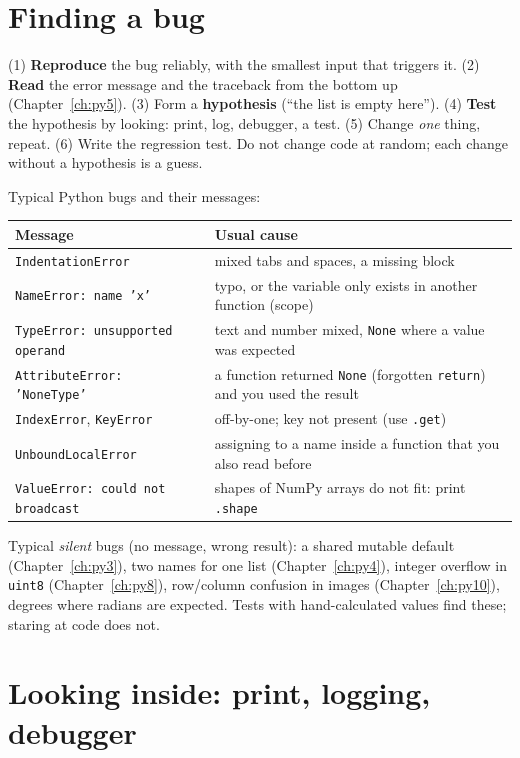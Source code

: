 \section*{Finding a bug}
\begin{keyidea}
(1) \textbf{Reproduce} the bug reliably, with the smallest input that triggers it. (2) \textbf{Read} the error message and the traceback from the bottom up (Chapter~\ref{ch:py5}). (3) Form a \textbf{hypothesis} (``the list is empty here''). (4) \textbf{Test} the hypothesis by looking: print, log, debugger, a test. (5) Change \emph{one} thing, repeat. (6) Write the regression test. Do not change code at random; each change without a hypothesis is a guess.
\end{keyidea}
Typical Python bugs and their messages:
\begin{center}
\renewcommand{\arraystretch}{1.2}
\begin{tabular}{p{4.6cm}p{8.4cm}}
\textbf{Message} & \textbf{Usual cause}\\ \hline
\texttt{IndentationError} & mixed tabs and spaces, a missing block\\
\texttt{NameError: name 'x'} & typo, or the variable only exists in another function (scope)\\
\texttt{TypeError: unsupported operand} & text and number mixed, \texttt{None} where a value was expected\\
\texttt{AttributeError: 'NoneType'} & a function returned \texttt{None} (forgotten \texttt{return}) and you used the result\\
\texttt{IndexError}, \texttt{KeyError} & off-by-one; key not present (use \texttt{.get})\\
\texttt{UnboundLocalError} & assigning to a name inside a function that you also read before\\
\texttt{ValueError: could not broadcast} & shapes of NumPy arrays do not fit: print \texttt{.shape}\\
\end{tabular}
\end{center}
Typical \emph{silent} bugs (no message, wrong result): a shared mutable default (Chapter~\ref{ch:py3}), two names for one list (Chapter~\ref{ch:py4}), integer overflow in \texttt{uint8} (Chapter~\ref{ch:py8}), row/column confusion in images (Chapter~\ref{ch:py10}), degrees where radians are expected. Tests with hand-calculated values find these; staring at code does not.

\section*{Looking inside: print, logging, debugger}
